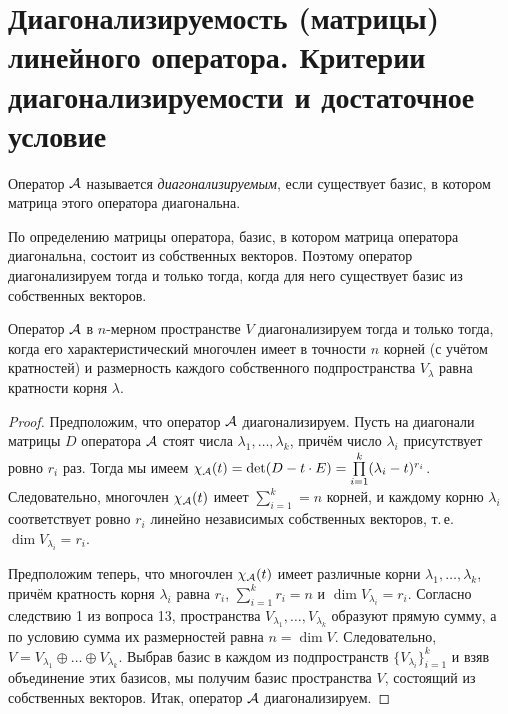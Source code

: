 \section{Диагонализируемость (матрицы) линейного оператора. Критерии диагонализируемости и достаточное условие}

\begin{definition}
    Оператор $\mathcal{A}$ называется \textit{диагонализируемым}, если существует базис, в котором матрица этого оператора диагональна.
\end{definition}

По определению матрицы оператора, базис, в котором матрица оператора диагональна, состоит из собственных векторов. Поэтому оператор диагонализируем тогда и только тогда, когда для него существует базис из собственных векторов.

\begin{theorem}
    Оператор $\mathcal{A}$ в $n$-мерном пространстве $V$ диагонализируем тогда и только тогда, когда его характеристический многочлен имеет в точности $n$ корней (с учётом кратностей) и размерность каждого собственного подпространства $V_\lambda$ равна кратности корня $\lambda$.
\end{theorem}

\begin{proof}
    Предположим, что оператор $\mathcal{A}$ диагонализируем. Пусть на диагонали матрицы $D$ оператора $\mathcal{A}$ стоят числа $\lambda_1, \ldots, \lambda_k$, причём число $\lambda_i$ присутствует ровно $r_i$ раз. Тогда мы имеем $\chi_{\mathcal{A}}(t) = \det (D - t \cdot E) = \prod\limits_{i = 1}^k(\lambda_i - t)^{r_i}$. Следовательно, многочлен $\chi_{\mathcal{A}}(t)$ имеет $\sum\limits_{i = 1}^k = n$ корней, и каждому корню $\lambda_i$ соответствует ровно $r_i$ линейно независимых собственных векторов, т.\,е. $\dim V_{\lambda_i} = r_i$.

    Предположим теперь, что многочлен $\chi_{\mathcal{A}}(t)$ имеет различные корни $\lambda_1, \ldots, \lambda_k$, причём кратность корня $\lambda_i$ равна $r_i$, $\sum\limits_{i = 1}^kr_i = n$ и $\dim V_{\lambda_i} = r_i$. Согласно следствию 1 из вопроса 13, пространства $V_{\lambda_1}, \ldots, V_{\lambda_k}$ образуют прямую сумму, а по условию сумма их размерностей равна $n = \dim V$. Следовательно, $V = V_{\lambda_1} \oplus \ldots \oplus V_{\lambda_k}$. Выбрав базис в каждом из подпространств $\{V_{\lambda_i}\}_{i = 1}^k$ и взяв объединение этих базисов, мы получим базис пространства $V$, состоящий из собственных векторов. Итак, оператор $\mathcal{A}$ диагонализируем.
\end{proof}

